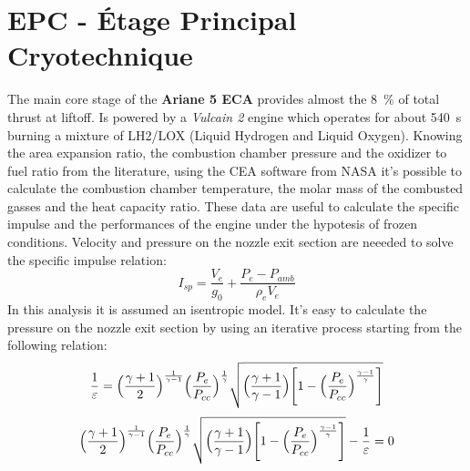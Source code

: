 \documentclass[12pt,fleqn,openany]{book} %
\begin{document}
\section{EPC - Étage Principal Cryotechnique}
The main core stage of the \textbf{Ariane 5 ECA} provides almost the \SI{8}{\%} of total thrust at liftoff. Is powered by a \textit{Vulcain 2} engine which operates for about \SI{540}{s} burning a mixture of LH2/LOX (Liquid Hydrogen and Liquid Oxygen). Knowing the area expansion ratio, the combustion chamber pressure and the oxidizer to fuel ratio from the literature, using the CEA software from NASA it's possible to calculate the combustion chamber temperature, the molar mass of the combusted gasses and the heat capacity ratio. These data are useful to calculate the specific impulse and the performances of the engine under the hypotesis of frozen conditions.
Velocity and pressure on the nozzle exit section are neeeded to solve the specific impulse relation:
\begin{equation}
 I_{sp}=\frac{V_e}{g_0}+\frac{P_e-P_{amb}}{\rho_eV_e}
\end{equation}
\noindent In this analysis it is assumed an isentropic model. It's easy to calculate the pressure on the nozzle exit section by using an iterative process starting from the following relation:
\begin{equation}
  \frac{1}{\varepsilon}=\Bigl(\frac{\gamma+1}{2}\Bigr)^{\frac{1}{\gamma-1}}\Bigl(\frac{P_e}{P_{cc}}\Bigr)^{\frac{1}{\gamma}}\sqrt{\Bigl(\frac{\gamma+1}{\gamma-1}\Bigr)\Biggl[1-\Bigl(\frac{P_e}{P_{cc}}\Bigr)^{\frac{\gamma-1}{\gamma}}\Biggr]}              
\end{equation}
\begin{equation}
  \Bigl(\frac{\gamma+1}{2}\Bigr)^{\frac{1}{\gamma-1}}\Bigl(\frac{P_e}{P_{cc}}\Bigr)^{\frac{1}{\gamma}}\sqrt{\Bigl(\frac{\gamma+1}{\gamma-1}\Bigr)\Biggl[1-\Bigl(\frac{P_e}{P_{cc}}\Bigr)^{\frac{\gamma-1}{\gamma}}\Biggr]}-\frac{1}{\varepsilon}=0              
\end{equation}
\end{document}
